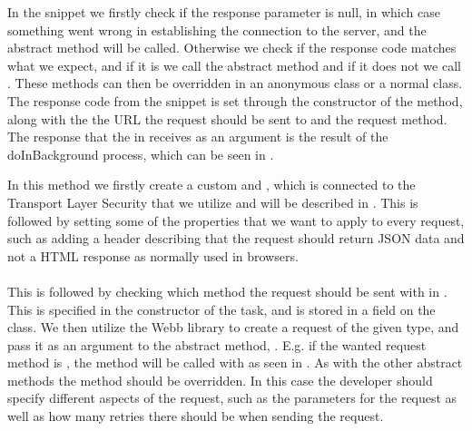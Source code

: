 
\FloatBarrier

In the snippet we firstly check if the response parameter is null, in which case something went wrong in establishing the connection to the server, and the abstract method  will be called. Otherwise we check if the response code matches what we expect, and if it is we call the abstract method  and if it does not we call . These methods can then be overridden in an anonymous class or a normal class. The response code from the snippet is set through the constructor of the method, along with the the URL the request should be sent to and the request method. The response that the  in  receives as an argument is the result of the doInBackground process, which can be seen in . 


\FloatBarrier

In this method we firstly create a custom  and , which is connected to the Transport Layer Security that we utilize and will be described in . This is followed by setting some of the properties that we want to apply to every request, such as adding a header describing that the request should return JSON data and not a HTML response as normally used in browsers. 
\\\\
This is followed by checking which method the request should be sent with in . This is specified in the constructor of the task, and is stored in a field on the class. We then utilize the Webb library to create a request of the given type, and pass it as an argument to the abstract method, . E.g. if the wanted request method is , the  method will be called with  as seen in . As with the other abstract methods the  method should be overridden. In this case the developer should specify different aspects of the request, such as the parameters for the request as well as how many retries there should be when sending the request.
